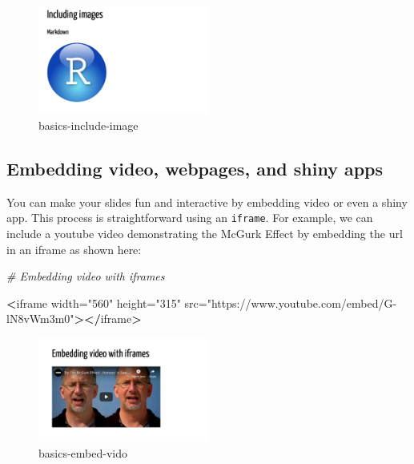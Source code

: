 \documentclass[
]{book}
\newenvironment{Shaded}{\begin{snugshade}}{\end{snugshade}}
\newcommand{\CommentTok}[1]{\textcolor[rgb]{0.37,0.37,0.37}{\textit{#1}}}
\newcommand{\ErrorTok}[1]{\textcolor[rgb]{0.14,0.14,0.14}{\textbf{#1}}}
\newcommand{\NormalTok}[1]{#1}
\newcommand{\OperatorTok}[1]{\textcolor[rgb]{0.43,0.43,0.43}{\textbf{#1}}}
\newcommand{\StringTok}[1]{\textcolor[rgb]{0.5,0.5,0.5}{#1}}
\begin{document}
\begin{figure}
\centering
\includegraphics[width=0.5\textwidth,height=\textheight]{img/02_basics-include-image.png}
\caption{basics-include-image}
\end{figure}

\hypertarget{embedding-video-webpages-and-shiny-apps}{%
\subsection{Embedding video, webpages, and shiny apps}\label{embedding-video-webpages-and-shiny-apps}}

You can make your slides fun and interactive by embedding video or even a shiny app. This process is straightforward using an \texttt{iframe}. For example, we can include a youtube video demonstrating the McGurk Effect by embedding the url in an iframe as shown here:

\begin{Shaded}
\begin{Highlighting}[]
\CommentTok{# Embedding video with iframes}

\OperatorTok{<}\NormalTok{iframe width=}\StringTok{"560"}\NormalTok{ height=}\StringTok{"315"} 
\NormalTok{src=}\StringTok{"https://www.youtube.com/embed/G-lN8vWm3m0"}\OperatorTok{>}\ErrorTok{</}\NormalTok{iframe}\OperatorTok{>}
\end{Highlighting}
\end{Shaded}

\begin{figure}
\centering
\includegraphics[width=0.5\textwidth,height=\textheight]{img/02_basics-embed-vido.png}
\caption{basics-embed-vido}
\end{figure}
\end{document}
